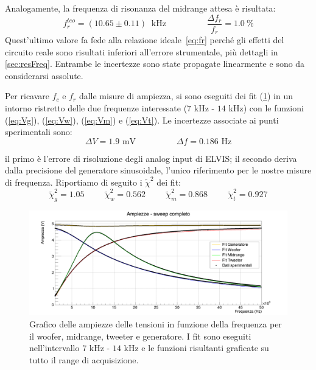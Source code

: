 \documentclass[12pt,italian]{article}
\begin{document}
\noindent
Analogamente, la frequenza di risonanza del midrange attesa è risultata:
\begin{equation*}
	f_{r}^{teo} = (10.65 \pm 0.11)\  \text{ kHz} \hspace{2cm} \frac{\Delta f_{r}}{f_{r}} = 1.0 \ \%
\end{equation*}
Quest'ultimo valore fa fede alla relazione ideale~\eqref{eq:fr} perché gli effetti del circuito reale sono risultati inferiori
all'errore strumentale, più dettagli in \cref{sec:resFreq}. Entrambe le incertezze sono state propagate linearmente e sono da considerarsi assolute.

Per ricavare $f_{c}$ e $f_{r}$ dalle misure di ampiezza, si sono eseguiti dei
fit (\cref{fig:amp_sweep}) in un intorno ristretto delle due frequenze
interessate ($ 7 $ kHz - $ 14 $ kHz) con le funzioni (\ref{eq:Vg}),
(\ref{eq:Vw}), (\ref{eq:Vm}) e (\ref{eq:Vt}). Le incertezze associate ai punti
sperimentali sono:
\begin{equation*}
	\Delta V = 1.9 \text{ mV} \hspace{2cm} \Delta f = 0.186 \text{ Hz}
\end{equation*}

\noindent
il primo è l'errore di risoluzione degli analog input di ELVIS; il secondo
deriva dalla precisione del generatore sinusoidale, l'unico riferimento per
le nostre misure di frequenza. Riportiamo di seguito i $\tilde{\chi}^2$ dei fit:
\begin{equation*}
	\tilde{\chi}^2_{g} = 1.05  \hspace{1cm} \tilde{\chi}^2_{w} = 0.562 \hspace{1cm} \tilde{\chi}^2_{m} = 0.868 \hspace{1cm} \tilde{\chi}^2_{t} = 0.927
\end{equation*}

\begin{figure}[h]
	\centering
	\includegraphics[width=\textwidth]{fig_amp.png}
	\caption{Grafico delle ampiezze delle tensioni in funzione della frequenza per il woofer, midrange, tweeter e generatore. I fit sono eseguiti nell'intervallo $7$ kHz - $14$ kHz e le funzioni risultanti graficate su tutto il range di acquisizione.}\label{fig:fc_fr}
	\label{fig:amp_sweep}
\end{figure}
\end{document}
